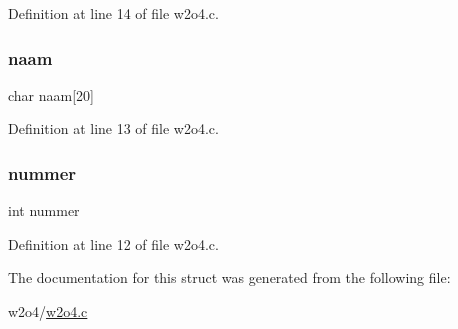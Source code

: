 Definition at line 14 of file w2o4.\+c.

\mbox{\label{structvoorwerp_ac3df76d68400202ee97a661ef59a9336}} 
\subsubsection{\texorpdfstring{naam}{naam}}
{\footnotesize\ttfamily char naam\mbox{[}20\mbox{]}}



Definition at line 13 of file w2o4.\+c.

\mbox{\label{structvoorwerp_a8d3dda061d3629ccf7a7af17b49c585d}} 
\subsubsection{\texorpdfstring{nummer}{nummer}}
{\footnotesize\ttfamily int nummer}



Definition at line 12 of file w2o4.\+c.



The documentation for this struct was generated from the following file\+:\begin{DoxyCompactItemize}
\item 
w2o4/\hyperlink{w2o4_8c}{w2o4.\+c}\end{DoxyCompactItemize}
